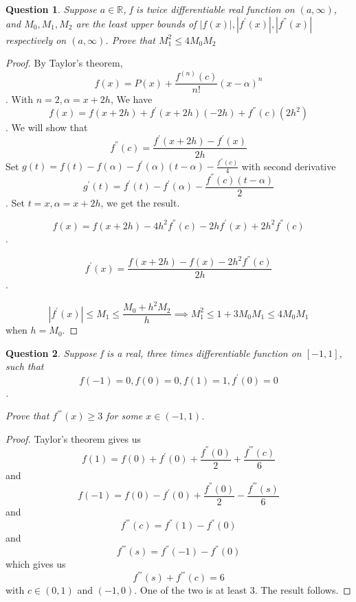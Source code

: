 \documentclass{article}
\theoremstyle{plain}
\newtheorem{question}{Question}
\theoremstyle{definition}
\begin{document}
\begin{question}
	Suppose $a \in \mathbb{R}$, f is twice differentiable real function on $(a,\infty)$, and $M_{0},M_{1},M_{2}$ are the least upper bounds of $|f(x)|, |f^{'}(x)|, |f^{''}(x)|$ respectively on $(a,\infty)$. Prove that $M_{1}^{2} \leq 4M_{0}M_{2}$
\end{question}

\begin{proof}
	By Taylor's theorem, $$ f(x) = P(x) + \frac{f^{(n)}(c)}{n!}(x - \alpha)^{n}$$. With $n = 2, \alpha = x + 2h$, We have $$ f(x) = f(x + 2h) + f^{'}(x + 2h)(-2h) + f^{''}(c)(2h^{2}) $$. We will show that $$f^{''}(c) = \frac{f^{'}(x + 2h) - f^{'}(x)}{2h}$$ Set $g(t) = f(t) - f(\alpha) - f^{'}(\alpha)(t - \alpha) - \frac{f^{''}(c)}{4}$ with second derivative $$ g^{'}(t) = f^{'}(t) - f^{'}(\alpha) - \frac{f^{''}(c)(t - \alpha)}{2}$$. Set $t = x, \alpha = x + 2h$, we get the result.

	$$ f(x) = f(x + 2h) - 4h^{2}f^{''}(c) - 2hf^{'}(x) + 2h^{2}f^{''}(c)$$.

	$$f^{'}(x) = \frac{f(x + 2h) - f(x) - 2h^{2}f^{''}(c)}{2h} $$.

	$$ |f^{'}(x)| \leq M_{1}\leq \frac{M_{0} + h^{2}M_{2}}{h} \implies M_{1}^{2} \leq 1 + 3M_{0}M_{1} \leq 4M_{0}M_{1}$$ when $h = M_{0}$.
\end{proof}

\begin{question}
	Suppose f is a real, three times differentiable function on $[-1,1]$, such that $$f(-1) = 0, f(0) = 0, f(1) = 1, f^{'}(0) = 0 $$.

	Prove that $f^{'''}(x) \geq 3$ for some $x \in (-1, 1)$.
\end{question}

\begin{proof}
	Taylor's theorem gives us $$f(1) = f(0) + f^{'}(0) + \frac{f^{''}(0)}{2} + \frac{f^{'''}(c)}6{} $$ and $$f(-1) = f(0) - f^{'}(0) + \frac{f^{''}(0)}{2} - \frac{f^{'''}(s)}{6} $$ and $$f^{'''}(c) = f^{''}(1) - f^{''}(0) $$ and $$f^{'''}(s) = f^{''}(-1) - f^{''}(0) $$ which gives us $$ f^{'''}(s) + f^{'''}(c) = 6$$ with $c \in (0,1)$ and $(-1, 0)$. One of the two is at least 3. The result follows.
\end{proof}
\end{document}
